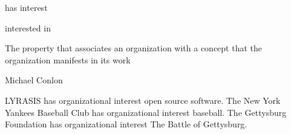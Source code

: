\documentclass[letterpaper,10pt,english]{sphinxmanual}
\begin{document}
\begin{sphinxShadowBox}

\sphinxAtStartPar
has interest
\end{sphinxShadowBox}

\begin{sphinxShadowBox}

\sphinxAtStartPar
interested in
\end{sphinxShadowBox}

\begin{sphinxShadowBox}

\sphinxAtStartPar
{}
\end{sphinxShadowBox}

\begin{sphinxShadowBox}

\sphinxAtStartPar
The property that associates an organization with a concept that the organization manifests in its work
\end{sphinxShadowBox}

\begin{sphinxShadowBox}

\sphinxAtStartPar
Michael Conlon 
\end{sphinxShadowBox}

\begin{sphinxShadowBox}

\sphinxAtStartPar
{\hyperref[\detokenize{doc-ORG_0000001::doc}]{}}
\end{sphinxShadowBox}

\begin{sphinxShadowBox}

\sphinxAtStartPar
{}
\end{sphinxShadowBox}

\begin{sphinxShadowBox}

\sphinxAtStartPar
LYRASIS has organizational interest open source software.  The New York Yankees Baseball Club has organizational interest baseball.  The Gettysburg Foundation has organizational interest The Battle of Gettysburg.
\end{sphinxShadowBox}
\end{document}
